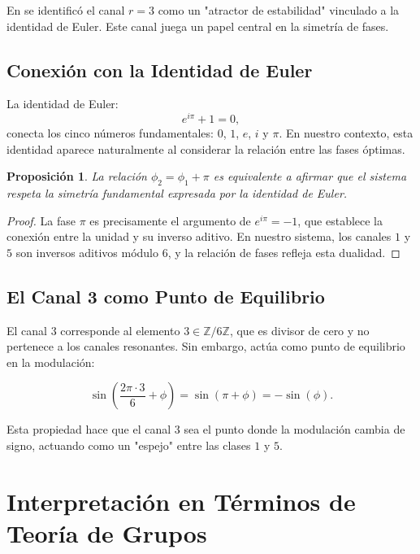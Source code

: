 \documentclass[12pt,a4paper]{article}
\theoremstyle{plain}
\newtheorem{proposicion}[teorema]{Proposición}
\theoremstyle{definition}
\theoremstyle{remark}
\begin{document}
En \cite{PeinadorSpectrum} se identificó el canal $r=3$ como un "atractor de estabilidad" vinculado a la identidad de Euler. Este canal juega un papel central en la simetría de fases.

\subsection{Conexión con la Identidad de Euler}

La identidad de Euler:
\begin{equation}
e^{i\pi} + 1 = 0,
\label{eq:euler}
\end{equation}
conecta los cinco números fundamentales: $0$, $1$, $e$, $i$ y $\pi$. En nuestro contexto, esta identidad aparece naturalmente al considerar la relación entre las fases óptimas.

\begin{proposicion}
La relación $\phi_2 = \phi_1 + \pi$ es equivalente a afirmar que el sistema respeta la simetría fundamental expresada por la identidad de Euler.
\end{proposicion}

\begin{proof}
La fase $\pi$ es precisamente el argumento de $e^{i\pi} = -1$, que establece la conexión entre la unidad y su inverso aditivo. En nuestro sistema, los canales $1$ y $5$ son inversos aditivos módulo $6$, y la relación de fases refleja esta dualidad.
\end{proof}

\subsection{El Canal 3 como Punto de Equilibrio}

El canal $3$ corresponde al elemento $3 \in \mathbb{Z}/6\mathbb{Z}$, que es divisor de cero y no pertenece a los canales resonantes. Sin embargo, actúa como punto de equilibrio en la modulación:

\begin{equation}
\sin\left(\frac{2\pi \cdot 3}{6} + \phi\right) = \sin(\pi + \phi) = -\sin(\phi).
\end{equation}

Esta propiedad hace que el canal $3$ sea el punto donde la modulación cambia de signo, actuando como un "espejo" entre las clases $1$ y $5$.

\section{Interpretación en Términos de Teoría de Grupos}
\end{document}
